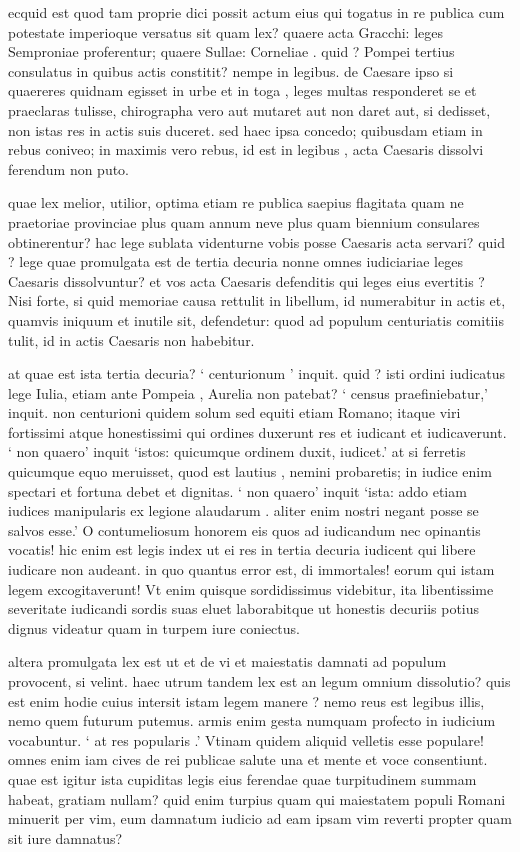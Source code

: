  ecquid est quod tam proprie dici possit actum eius qui togatus in re publica cum potestate imperioque versatus sit quam lex? quaere acta Gracchi: leges Semproniae proferentur; quaere Sullae: Corneliae . quid ? Pompei tertius consulatus in quibus actis constitit? nempe in legibus. de Caesare ipso si quaereres quidnam egisset in urbe et in toga , leges multas responderet se et praeclaras tulisse, chirographa vero aut mutaret aut non daret aut, si dedisset, non istas res in actis suis duceret. sed haec ipsa concedo; quibusdam etiam in rebus coniveo; in maximis vero rebus, id est in legibus , acta Caesaris dissolvi ferendum non puto.

 quae lex melior, utilior, optima etiam re publica saepius flagitata quam ne praetoriae provinciae plus quam annum neve plus quam biennium consulares obtinerentur? hac lege sublata videnturne vobis posse Caesaris acta servari? quid ? lege quae promulgata est de tertia decuria nonne omnes iudiciariae leges Caesaris dissolvuntur? et vos acta Caesaris defenditis qui leges eius evertitis ? Nisi forte, si quid memoriae causa rettulit in libellum, id numerabitur in actis et, quamvis iniquum et inutile sit, defendetur: quod ad populum centuriatis comitiis tulit, id in actis Caesaris non habebitur.

 at quae est ista tertia decuria? ` centurionum ' inquit. quid ? isti ordini iudicatus lege Iulia, etiam ante Pompeia , Aurelia non patebat? ` census praefiniebatur,' inquit. non centurioni quidem solum sed equiti etiam Romano; itaque viri fortissimi atque honestissimi qui ordines duxerunt res et iudicant et iudicaverunt. ` non quaero' inquit `istos: quicumque ordinem duxit, iudicet.' at si ferretis quicumque equo meruisset, quod est lautius , nemini probaretis; in iudice enim spectari et fortuna debet et dignitas. ` non quaero' inquit `ista: addo etiam iudices manipularis ex legione alaudarum . aliter enim nostri negant posse se salvos esse.' O contumeliosum honorem eis quos ad iudicandum nec opinantis vocatis! hic enim est legis index ut ei res in tertia decuria iudicent qui libere iudicare non audeant. in quo quantus error est, di immortales! eorum qui istam legem excogitaverunt! Vt enim quisque sordidissimus videbitur, ita libentissime severitate iudicandi sordis suas eluet laborabitque ut honestis decuriis potius dignus videatur quam in turpem iure coniectus.

 altera promulgata lex est ut et de vi et maiestatis damnati ad populum provocent, si velint. haec utrum tandem lex est an legum omnium dissolutio? quis est enim hodie cuius intersit istam legem manere ? nemo reus est legibus illis, nemo quem futurum putemus. armis enim gesta numquam profecto in iudicium vocabuntur. ` at res popularis .' Vtinam quidem aliquid velletis esse populare! omnes enim iam cives de rei publicae salute una et mente et voce consentiunt. quae est igitur ista cupiditas legis eius ferendae quae turpitudinem summam habeat, gratiam nullam? quid enim turpius quam qui maiestatem populi Romani minuerit per vim, eum damnatum iudicio ad eam ipsam vim reverti propter quam sit iure damnatus?

